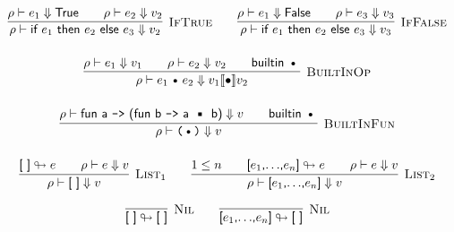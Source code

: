 \documentclass{article}
\def\code#1{\textsf{#1}}
\def\rt{\Downarrow}
\def\binop{\, \text{\textbullet}\, }
\def\envj#1#2#3{#1 \vdash #2 \rt #3}
\def\tsc#1{\textsc{#1}}
\begin{document}
\begin{gather*}
\infer[\tsc{IfTrue}]{\envj \rho {\code{if $e_1$ then $e_2$ else $e_3$}} {v_2}}{\envj \rho {e_1} {\code{True}} && \envj \rho {e_2} {v_2}}\qquad
\infer[\tsc{IfFalse}]{\envj \rho {\code{if $e_1$ then $e_2$ else $e_3$}} {v_3}}{\envj \rho {e_1} {\code{False}} && \envj \rho {e_3} {v_3}}
\\[12pt]
\infer[\tsc{BuiltInOp}]{\envj \rho {e_1 \binop e_2} {v_1\llbracket\bullet \rrbracket v_2}}{\envj \rho {e_1} {v_1} && \envj {\rho} {e_2} {v_2} && \textsf{builtin}\, \binop}\\[12pt]
\infer[\tsc{BuiltInFun}]{\envj \rho {\texttt{($\binop$)}} {v}}{\envj \rho {\code{fun a \texttt{->} (fun b \texttt{->} a $\binop$ b)}} {v} && \textsf{builtin}\, \binop}\\[12pt]
\infer[\tsc{List}_1]{\envj \rho {\code{[ ]}} {v}}{\code{[ ]}\looparrowright e && \envj \rho e v}\qquad 
\infer[\tsc{List}_2]{\envj \rho {\code{[$e_1$,$\ldots$,$e_n$]}} {v}}{1 \leq n && \code{[$e_1$,$\ldots$,$e_n$]}\looparrowright e && \envj \rho e v}
\end{gather*}



\begin{gather*}
\infer[\tsc{Nil}]{\code{[ ]}\looparrowright \code{[ ]}}{}\qquad
\infer[\tsc{Nil}]{\code{[$e_1$,$\ldots$,$e_n$]}\looparrowright \code{[ ]}}{}
\end{gather*}
\end{document}
